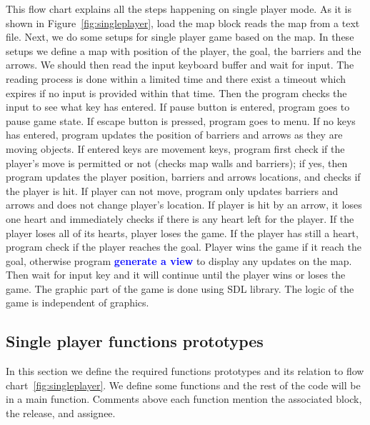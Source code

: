 This flow chart explains all the steps happening on single player mode. 
As it is shown in Figure~\ref{fig:singleplayer}, load the map block reads the map from a text file. Next, we do some setups for single player game based on the map. In these setups we define a map with position of the player, the goal, the barriers and the arrows.
We should then read the input keyboard buffer and wait for input. The reading process is done within a limited time and there exist a timeout which expires if no input is provided within that time. Then the program checks the input to see what key has entered. If pause button is entered, program goes to pause game state. If escape button is pressed, program goes to menu. If no keys has entered, program updates the position of barriers and arrows as they are moving objects. If entered keys are movement keys, program first check if the player's move is permitted or not (checks map walls and barriers); if yes, then program updates the player position, barriers and arrows locations, and checks if the player is hit. If player can not move, program only updates barriers and arrows and does not change player's location. If player is hit by an arrow, it loses one heart and immediately checks if there is any heart left for the player. If the player loses all of its hearts, player loses the game. If the player has still a heart, program check if the player reaches the goal. Player wins the game if it reach the goal, otherwise program \textcolor{blue}{\bf generate a view} to display any updates on the map. Then wait for input key and it will continue until the player wins or loses the game.
The graphic part of the game is done using SDL library. The logic of the game is independent of graphics.

\subsection{Single player functions prototypes}
In this section we define the required functions prototypes and its relation to flow chart~\ref{fig:singleplayer}. We define some functions and the rest of the code will be in a main function. Comments above each function mention the associated block, the release, and assignee.

